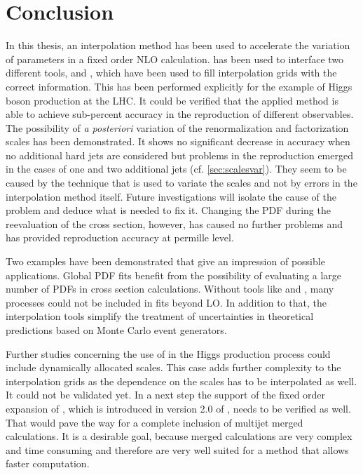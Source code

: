 
\chapter{Conclusion}
In this thesis, an interpolation method has been used to accelerate the variation of parameters in a fixed order NLO calculation.
\mcgrid{} has been used to interface two different tools, \appl{} and \fnlo{}, which have been used to fill interpolation grids with the correct information.
This has been performed explicitly for the example of Higgs boson production at the LHC.
It could be verified that the applied method is able to achieve sub-percent accuracy in the reproduction of different observables.
The possibility of \textit{a posteriori} variation of the renormalization and factorization scales has been demonstrated.
It shows no significant decrease in accuracy when no additional hard jets are considered but problems in the reproduction emerged in the cases of one and two additional jets (cf. \cref{sec:scalesvar}).
They seem to be caused by the technique that is used to variate the scales and not by errors in the interpolation method itself.
Future investigations will isolate the cause of the problem and deduce what is needed to fix it.
Changing the PDF during the reevaluation of the cross section, however, has caused no further problems and has provided reproduction accuracy at permille level.

Two examples have been demonstrated that give an impression of possible applications.
Global PDF fits benefit from the possibility of evaluating a large number of PDFs in cross section calculations.
Without tools like \appl{} and \fnlo{}, many processes could not be included in fits beyond LO.
In addition to that, the interpolation tools simplify the treatment of uncertainties in theoretical predictions based on Monte Carlo event generators.

Further studies concerning the use of \mcgrid{} in the Higgs production process could include dynamically allocated scales.
This case adds further complexity to the interpolation grids as the dependence on the scales has to be interpolated as well.
It could not be validated yet.
In a next step the support of the fixed order expansion of \mcatnlo{}, which is introduced in version 2.0 of \mcgrid{}, needs to be verified as well.
That would pave the way for a complete inclusion of multijet merged calculations.
It is a desirable goal, because merged calculations are very complex and time consuming and therefore are very well suited for a method that allows faster computation.
%

